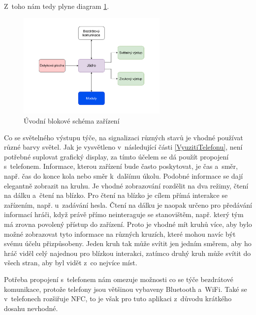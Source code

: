 Z~toho nám tedy plyne diagram \ref{fig:diagram_zanoreni_0}.
\begin{figure}[h]
    \centering
    \includegraphics[width=0.65\textwidth]{text/TeoretickyUvod/AplikaceHernichZarizeni/diagram/zanoreni_0.pdf}
    \caption{Úvodní blokové schéma zařízení}
    \label{fig:diagram_zanoreni_0}
\end{figure}

Co se světelného výstupu týče, na signalizaci různých stavů je vhodné používat různé barvy světel.
Jak je vysvětleno v~následující části \ref{VyuzitiTelefonu}, není potřebné suplovat grafický display, za tímto účelem se dá použít propojení s~telefonem.
Informace, kterou zařízení bude často poskytovat, je čas a~směr, např. čas do konce kola nebo směr k~dalšímu úkolu.
Podobné informace se dají elegantně zobrazit na kruhu.
Je vhodné zobrazování rozdělit na dva režimy, čtení na dálku a~čtení na blízko.
Pro čtení na blízko je cílem přímá interakce se zařízením, např. u~zadávání hesla.
Čtení na dálku je naopak určeno pro předávání informací hráči, když právě přímo neinteraguje se stanovištěm, např. který tým má zrovna povolený přístup do zařízení.
Proto je vhodné mít kruhů více, aby bylo možné zobrazovat tyto informace na různých kruzích, které mohou navíc být svému účelu přizpůsobeny.
Jeden kruh tak může svítit jen jedním směrem, aby ho hráč viděl celý najednou pro blízkou interakci, zatímco druhý kruh může svítit do všech stran, aby byl vidět z~co nejvíce míst.

Potřeba propojení s~telefonem nám omezuje možnosti co se týče bezdrátové komunikace, protože telefony jsou většinou vybaveny Bluetooth a~WiFi.
Také se v~telefonech rozšiřuje NFC, to je však pro tuto aplikaci z~důvodu krátkého dosahu nevhodné.

